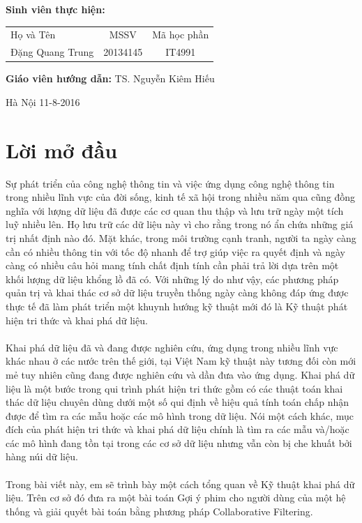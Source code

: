 \documentclass[a4paper,11pt]{report}
\begin{document}
\hspace{1cm}\fontsize{14}{16}\selectfont \textbf{Sinh viên thực hiện:}
\begin{longtable}{l c c }
Họ và Tên & MSSV &    Mã học phần \\[0.5cm]
Đặng Quang Trung &    20134145 & IT4991\\
\end{longtable}
\hspace{0.3cm}\fontsize{14}{16}\selectfont \textbf{Giáo viên hướng dẫn:} TS. Nguyễn Kiêm Hiếu\\[1.0cm]
\begin{center}
\fontsize{16}{19}\selectfont Hà Nội 11-8-2016
\end{center} 
\tableofcontents
\chapter*{Lời mở đầu}
Sự phát triển của công nghệ thông tin và việc ứng dụng công nghệ thông tin trong nhiều
lĩnh vực của đời sống, kinh tế xã hội trong nhiều năm qua cũng đồng nghĩa với lượng dữ
liệu đã được các cơ quan thu thập và lưu trữ ngày một tích luỹ nhiều lên. Họ lưu trữ các
dữ liệu này vì cho rằng trong nó ẩn chứa những giá trị nhất định nào đó. Mặt khác, trong
môi trường cạnh tranh, người ta ngày càng cần có nhiều thông tin với tốc độ nhanh để trợ
giúp việc ra quyết định và ngày càng có nhiều câu hỏi mang tính chất định tính cần phải
trả lời dựa trên một khối lượng dữ liệu khổng lồ đã có. Với những lý do như vậy, các
phương pháp quản trị và khai thác cơ sở dữ liệu truyền thống ngày càng không đáp ứng
được thực tế đã làm phát triển một khuynh hướng kỹ thuật mới đó là Kỹ thuật phát hiện
tri thức và khai phá dữ liệu. \\ \\ 
Khai phá dữ liệu đã và đang được nghiên cứu, ứng dụng trong nhiều lĩnh vực khác nhau
ở các nước trên thế giới, tại Việt Nam kỹ thuật này tương đối còn mới mẻ tuy nhiên cũng
đang được nghiên cứu và dần đưa vào ứng dụng. Khai phá dữ liệu là một bước trong qui
trình phát hiện tri thức gồm có các thuật toán khai thác dữ liệu chuyên dùng dưới một số
qui định về hiệu quả tính toán chấp nhận được để tìm ra các mẫu hoặc các mô hình trong
dữ liệu. Nói một cách khác, mục đích của phát hiện tri thức và khai phá dữ liệu chính là
tìm ra các mẫu và/hoặc các mô hình đang tồn tại trong các cơ sở dữ liệu nhưng vẫn còn bị
che khuất bởi hàng núi dữ liệu. \\ \\ 
Trong bài viết này, em sẽ trình bày một cách tổng quan về Kỹ thuật khai phá dữ liệu.
Trên cơ sở đó đưa ra một bài toán Gợi ý phim cho người dùng của một hệ thống và giải
quyết bài toán bằng phương pháp Collaborative Filtering. 
\end{document}
